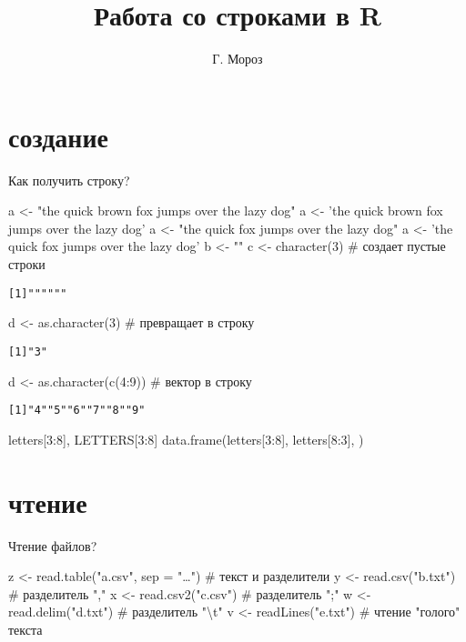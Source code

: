 
\title[]{Работа со строками в R}
\author[]{Г. Мороз}
\date{}

\frame{\titlepage}
\section{создание}
\begin{frame}[fragile]{Как получить строку?}
\begin{itemize}
\mytem a <- "the quick brown fox jumps over the lazy dog"
\mytem a <- 'the quick brown fox jumps over the lazy dog'
\mytem a <- "the quick {} fox jumps over the lazy dog"
\mytem a <- 'the quick {} fox jumps over the lazy dog'
\mytem b <- {}"{}"{}
\mytem c <- character(3) \hfill \# создает пустые строки\\
\footnotesize
\begin{alltt}
[1] "" "" ""
\end{alltt}
\normalsize
\mytem d <- as.character(3) \hfill \# превращает в строку\\
\footnotesize
\begin{alltt}
[1] "3"
\end{alltt}
\normalsize
\mytem d <- as.character(c(4:9)) \hfill \# вектор в строку\\
\footnotesize
\begin{alltt}
[1] "4" "5" "6" "7" "8" "9"
\end{alltt}
\normalsize
\mytem letters[3:8], LETTERS[3:8]
\mytem data.frame(letters[3:8], letters[8:3], {\color{red!13!blue}{stringsAsFactors = F}})
\end{itemize}
\end{frame}
\section{чтение}
\begin{frame}[fragile]{Чтение файлов?}
\begin{itemize}
\mytem z <- read.table("a.csv", sep = "\dots") \hfill \# текст и разделители
\mytem y <- read.csv("b.txt") \hfill \# разделитель "{},{}"
\mytem x <- read.csv2("c.csv") \hfill \# разделитель ";"
\mytem w <- read.delim("d.txt") \hfill \# разделитель "\textbackslash t"
\mytem v <- readLines("e.txt") \hfill \# чтение "голого"{} текста
\end{itemize}
\end{frame}
